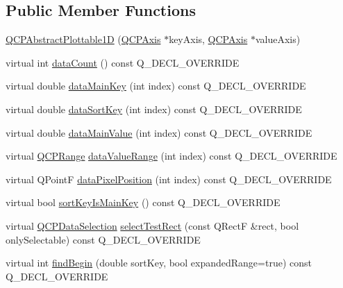 \subsection*{Public Member Functions}
\begin{DoxyCompactItemize}
\item 
\hyperlink{classQCPAbstractPlottable1D_a30b2e50ab0afce65f104ea7a95440315}{Q\+C\+P\+Abstract\+Plottable1D} (\hyperlink{classQCPAxis}{Q\+C\+P\+Axis} $\ast$key\+Axis, \hyperlink{classQCPAxis}{Q\+C\+P\+Axis} $\ast$value\+Axis)
\item 
virtual int \hyperlink{classQCPAbstractPlottable1D_ab5dd99e4f1621e7dbd63438e0b02984e}{data\+Count} () const Q\+\_\+\+D\+E\+C\+L\+\_\+\+O\+V\+E\+R\+R\+I\+DE
\item 
virtual double \hyperlink{classQCPAbstractPlottable1D_aeb156ebf5d3c8de906b428be30733ad8}{data\+Main\+Key} (int index) const Q\+\_\+\+D\+E\+C\+L\+\_\+\+O\+V\+E\+R\+R\+I\+DE
\item 
virtual double \hyperlink{classQCPAbstractPlottable1D_aa8277da921b009bce474437d50b4a2d8}{data\+Sort\+Key} (int index) const Q\+\_\+\+D\+E\+C\+L\+\_\+\+O\+V\+E\+R\+R\+I\+DE
\item 
virtual double \hyperlink{classQCPAbstractPlottable1D_a6be0f657ba85a1688336d76ad649ecf2}{data\+Main\+Value} (int index) const Q\+\_\+\+D\+E\+C\+L\+\_\+\+O\+V\+E\+R\+R\+I\+DE
\item 
virtual \hyperlink{classQCPRange}{Q\+C\+P\+Range} \hyperlink{classQCPAbstractPlottable1D_a55f937ba6a63e56e57f0b1a6e85a333a}{data\+Value\+Range} (int index) const Q\+\_\+\+D\+E\+C\+L\+\_\+\+O\+V\+E\+R\+R\+I\+DE
\item 
virtual Q\+PointF \hyperlink{classQCPAbstractPlottable1D_a6ca0699a6af5f25a7565de7c50ce13b2}{data\+Pixel\+Position} (int index) const Q\+\_\+\+D\+E\+C\+L\+\_\+\+O\+V\+E\+R\+R\+I\+DE
\item 
virtual bool \hyperlink{classQCPAbstractPlottable1D_afe0d56e39cc076032922f059b304c092}{sort\+Key\+Is\+Main\+Key} () const Q\+\_\+\+D\+E\+C\+L\+\_\+\+O\+V\+E\+R\+R\+I\+DE
\item 
virtual \hyperlink{classQCPDataSelection}{Q\+C\+P\+Data\+Selection} \hyperlink{classQCPAbstractPlottable1D_a22377bf6e57ab7eedbc9e489250c6ded}{select\+Test\+Rect} (const Q\+RectF \&rect, bool only\+Selectable) const Q\+\_\+\+D\+E\+C\+L\+\_\+\+O\+V\+E\+R\+R\+I\+DE
\item 
virtual int \hyperlink{classQCPAbstractPlottable1D_ad0b46d25cde3d035b180fb8f10c056e6}{find\+Begin} (double sort\+Key, bool expanded\+Range=true) const Q\+\_\+\+D\+E\+C\+L\+\_\+\+O\+V\+E\+R\+R\+I\+DE

\end{DoxyCompactItemize}
